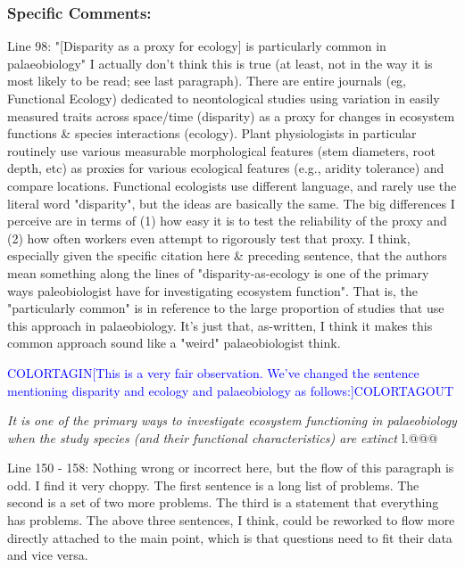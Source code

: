 \documentclass[12pt,letterpaper]{article}
\begin{document}
\subsubsection{Specific Comments:}

\noindent Line 98: "[Disparity as a proxy for ecology] is particularly common in palaeobiology" I actually don't think this is true (at least, not in the way it is most likely to be read; see last paragraph). There are entire journals (eg, Functional Ecology) dedicated to neontological studies using variation in easily measured traits across space/time (disparity) as a proxy for changes in ecosystem functions \& species interactions (ecology). Plant physiologists in particular routinely use various measurable morphological features (stem diameters, root depth, etc) as proxies for various ecological features (e.g., aridity tolerance) and compare locations. 
Functional ecologists use different language, and rarely use the literal word "disparity", but the ideas are basically the same. The big differences I perceive are in terms of (1) how easy it is to test the reliability of the proxy and (2) how often workers even attempt to rigorously test that proxy. 
I think, especially given the specific citation here \& preceding sentence, that the authors mean something along the lines of "disparity-as-ecology is one of the primary ways paleobiologist have for investigating ecosystem function". That is, the "particularly common" is in reference to the large proportion of studies that use this approach in palaeobiology. It's just that, as-written, I think it makes this common approach sound like a "weird" palaeobiologist think.

\textcolor{blue}{COLORTAGIN[This is a very fair observation. We've changed the sentence mentioning disparity and ecology and palaeobiology as follows:]COLORTAGOUT}

\textit{It is one of the primary ways to investigate ecosystem functioning in palaeobiology when the study species (and their functional characteristics) are extinct \citep{Wainwright2005}} l.@@@

\noindent Line 150 - 158: Nothing wrong or incorrect here, but the flow of this paragraph is odd. I find it very choppy. The first sentence is a long list of problems. The second is a set of two more problems. The third is a statement that everything has problems. The above three sentences, I think, could be reworked to flow more directly attached to the main point, which is that questions need to fit their data and vice versa.
\end{document}
